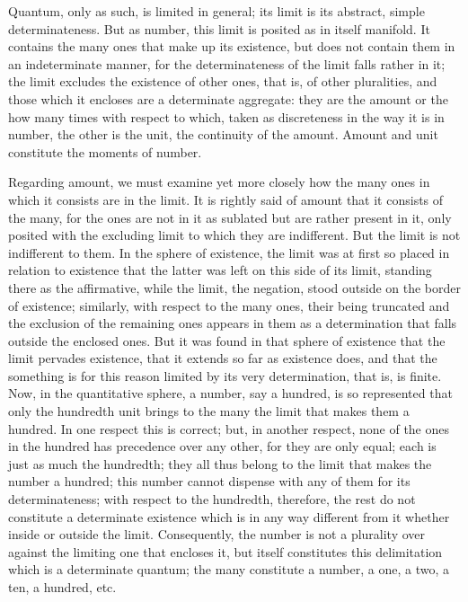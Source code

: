 Quantum, only as such, is limited in general;
its limit is its abstract, simple determinateness.
But as number, this limit is posited as in itself manifold.
It contains the many ones that make up its existence,
but does not contain them in an indeterminate manner,
for the determinateness of the limit falls rather in it;
the limit excludes the existence of other ones,
that is, of other pluralities,
and those which it encloses are a determinate aggregate:
they are the amount or the how many times with respect to which,
taken as discreteness in the way it is in number,
the other is the unit, the continuity of the amount.
Amount and unit constitute the moments of number.

Regarding amount, we must examine yet more closely
how the many ones in which it consists are in the limit.
It is rightly said of amount that it consists of the many,
for the ones are not in it as sublated but are rather present in it,
only posited with the excluding limit
to which they are indifferent.
But the limit is not indifferent to them.
In the sphere of existence, the limit was
at first so placed in relation to existence
that the latter was left on this side of its limit,
standing there as the affirmative,
while the limit, the negation,
stood outside on the border of existence;
similarly, with respect to the many ones,
their being truncated and the exclusion of the remaining ones
appears in them as a determination
that falls outside the enclosed ones.
But it was found in that sphere of existence
that the limit pervades existence,
that it extends so far as existence does,
and that the something is for this reason
limited by its very determination, that is, is finite.
Now, in the quantitative sphere, a number, say a hundred,
is so represented that only the hundredth unit brings to the many
the limit that makes them a hundred.
In one respect this is correct;
but, in another respect, none of the ones in the hundred
has precedence over any other, for they are only equal;
each is just as much the hundredth;
they all thus belong to the limit that
makes the number a hundred;
this number cannot dispense with
any of them for its determinateness;
with respect to the hundredth, therefore,
the rest do not constitute a determinate existence
which is in any way different from it
whether inside or outside the limit.
Consequently, the number is not a plurality
over against the limiting one that encloses it,
but itself constitutes this delimitation
which is a determinate quantum;
the many constitute a number,
a one, a two, a ten, a hundred, etc.

